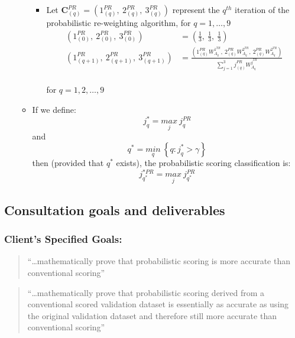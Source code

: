 \documentclass[12pt,]{article}
\providecommand{\tightlist}{%
  \setlength{\itemsep}{0pt}\setlength{\parskip}{0pt}}
\begin{document}
\begin{itemize}
\begin{itemize}
    \begin{itemize}
    \tightlist
    \item
      Let
      \(\mathbf{C}_{(q)}^{PR}=\left(1_{(q)}^{PR}, \ 2_{(q)}^{PR}, \ 3_{(q)}^{PR} \right)\)
      represent the \(q^{th}\) iteration of the probabilistic
      re-weighting algorithm, for \(q=1, \ldots, 9\)\\
      \begin{align*}
      \left(1_{(0)}^{PR}, \ 2_{(0)}^{PR}, \ 3_{(0)}^{PR} \right) &= \left( \frac{1}{3}, \  \frac{1}{3}, \ \frac{1}{3}\right) \\[0.5em]
      \left(1_{(q+1)}^{PR}, \ 2_{(q+1)}^{PR}, \ 3_{(q+1)}^{PR} \right) &= \frac{\left(1_{(q)}^{PR}W_{A_{q}}^{1^{TR}}, \ 2_{(q)}^{PR}W_{A_{q}}^{2^{TR}}, \ 2_{(q)}^{PR}W_{A_{q}}^{2^{TR}} \right) }{\sum_{j=1}^{3} j_{(q)}^{PR}W_{A_{q}}^{j^{TR}}} \tag{EQ-XX} \label{1.3.2 - 2}
      \end{align*}\\
      for \(q=1, 2, \ldots, 9\)
    \end{itemize}
  \item
    If we define: \[j_{q}^{*}= \underset{j}{max} \  j_{q}^{PR}\] and
    \[q^{*}=\underset{q}{min} \ \left \{q : j^{*}_{q} > \gamma    \right \} \]
    then (provided that \(q^{*}\) exists), the probabilistic scoring
    classification is:
    \[j_{q^{*}}^{*PR}=\underset{j}{max} \ j_{q^{*}}^{PR}\]
  \end{itemize}
\end{itemize}

\hypertarget{consultation-goals-and-deliverables}{%
\subsection{Consultation goals and
deliverables}\label{consultation-goals-and-deliverables}}

\hypertarget{clients-specified-goals}{%
\subsubsection{Client's Specified
Goals:}\label{clients-specified-goals}}

\begin{quote}
``\ldots{}mathematically prove that probabilistic scoring is more
accurate than conventional scoring''
\end{quote}

\begin{quote}
``\ldots{}mathematically prove that probabilistic scoring derived from a
conventional scored validation dataset is essentially as accurate as
using the original validation dataset and therefore still more accurate
than conventional scoring''
\end{quote}
\end{document}
